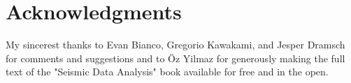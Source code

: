\section{Acknowledgments}

My sincerest thanks to Evan Bianco, Gregorio Kawakami, and Jesper Dramsch 
for comments and suggestions 
and to Öz Yilmaz for generously making the full text of the
"Seismic Data Analysis" book available for free and in the open.
